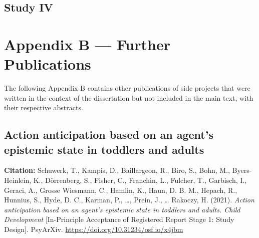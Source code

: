\documentclass[
]{scrbook}
\begin{document}
\begin{minipage}{\textwidth}

\end{minipage}



\newpage

\section*{Study IV}\label{studyIV}

\begin{minipage}{\textwidth}

\end{minipage}



\chapter*{Appendix B --- Further Publications}\label{appendixB}

The following Appendix B contains other publications of side projects that were written in the context of the dissertation but not included in the main text, with their respective abstracts.

\section*{Action anticipation based on an agent's epistemic state in toddlers and adults}\label{manybabies}

\textbf{Citation:} Schuwerk, T., Kampis, D., Baillargeon, R., Biro, S., Bohn, M., Byers-Heinlein, K., Dörrenberg, S., Fisher, C., Franchin, L., Fulcher, T., Garbisch, I., Geraci, A., Grosse Wiesmann, C., Hamlin, K., Haun, D. B. M., Hepach, R., Hunnius, S., Hyde, D. C., Karman, P., \ldots, Prein, J., \ldots{} Rakoczy, H. (2021). \emph{Action anticipation based on an agent's epistemic state in toddlers and adults. Child Development} {[}In-Principle Acceptance of Registered Report Stage 1: Study Design{]}. PsyArXiv. \mbox{\url{https://doi.org/10.31234/osf.io/x4jbm}}
\end{document}
